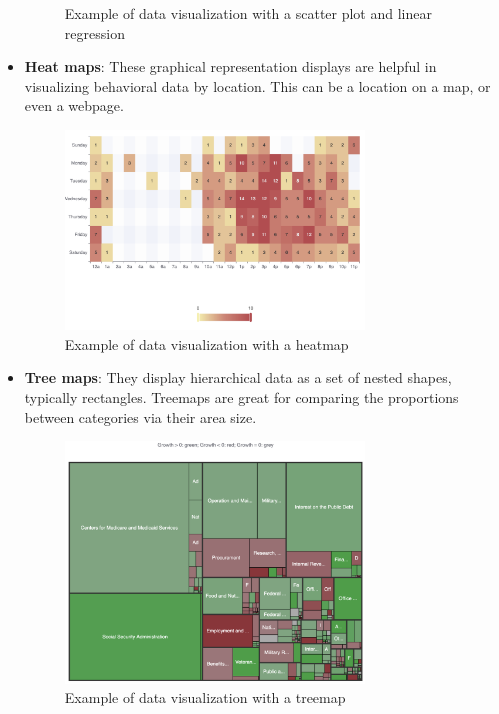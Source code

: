 \documentclass[MSE,Master,english]{twbook}%
\begin{document}
\begin{itemize}
\begin{figure}[H]
    \caption{Example of data visualization with a scatter plot and linear regression}
    \label{fig:scatter_example}
  \end{figure}
  \item \textbf{Heat maps}: These graphical representation displays are helpful in visualizing behavioral data by location. This can be a location on a map, or even a webpage.
  \begin{figure}[H]
    \centering
    \includegraphics[width=0.75\textwidth]{examples/heatmap.png}
    \caption{Example of data visualization with a heatmap}
    \label{fig:heatmap_example}
  \end{figure}
  \item \textbf{Tree maps}: They display hierarchical data as a set of nested shapes, typically rectangles. Treemaps are great for comparing the proportions between categories via their area size.
  \begin{figure}[H]
    \centering
    \includegraphics[width=0.75\textwidth]{examples/treemap.png}
    \caption{Example of data visualization with a treemap}
    \label{fig:treemap_example}
  \end{figure}
\end{itemize}
\end{document}
